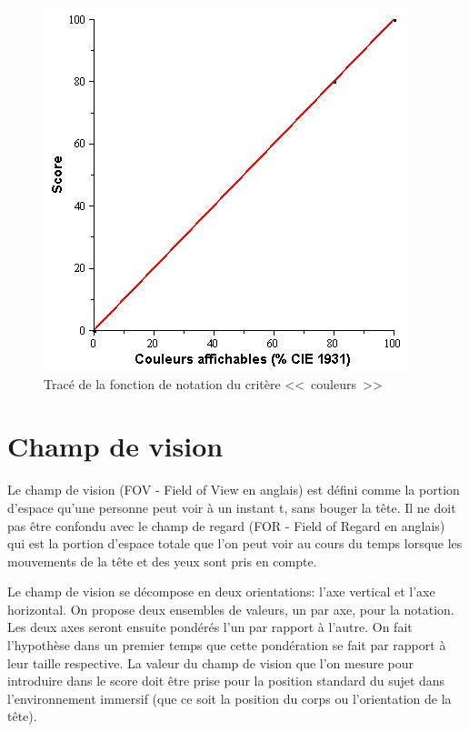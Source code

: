 	\begin{figure}
		\centering
		\includegraphics[scale=.75]{Figures/Color}
		\caption{Tracé de la fonction de notation du critère <<~couleurs~>>}
		\label{fig:score_color}
	\end{figure}
	
	\section{Champ de vision}
	\par Le champ de vision (FOV - Field of View en anglais) est défini comme la portion d'espace qu'une personne peut voir à un instant t, sans bouger la tête. Il ne doit pas être confondu avec le champ de regard (FOR - Field of Regard en anglais) qui est la portion d'espace totale que l'on peut voir au cours du temps lorsque les mouvements de la tête et des yeux sont pris en compte.

	\par Le champ de vision se décompose en deux orientations: l'axe vertical et l'axe horizontal. On propose deux ensembles de valeurs, un par axe, pour la notation. Les deux axes seront ensuite pondérés l'un par rapport à l'autre. On fait l'hypothèse dans un premier temps que cette pondération se fait par rapport à leur taille respective. La valeur du champ de vision que l'on mesure pour introduire dans le score doit être prise pour la position standard du sujet dans l'environnement immersif (que ce soit la position du corps ou l'orientation de la tête).
	
